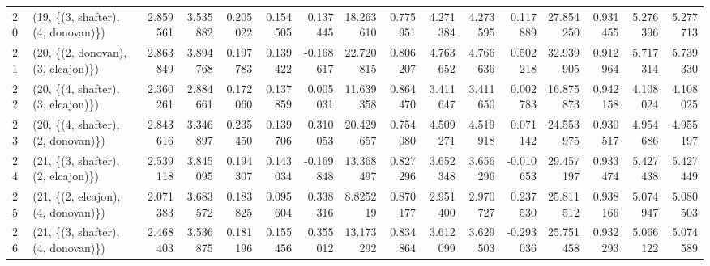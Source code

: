 \begin{tabular}{llrrrrrrrrrrrrrr}
20 &  (19, \{(3, shafter), (4, donovan)\}) &  2.859561 &  3.535882 &   0.205022 &  0.154505 &  0.137445 &  18.263610 &  0.775951 &   4.271384 &  4.273595 &  0.117889 &  27.854250 &  0.931455 &  5.276396 &  5.277713 \\
21 &  (20, \{(2, donovan), (3, elcajon)\}) &  2.863849 &  3.894768 &   0.197783 &  0.139422 & -0.168617 &  22.720815 &  0.806207 &   4.763652 &  4.766636 &  0.502218 &  32.939905 &  0.912964 &  5.717314 &  5.739330 \\
22 &  (20, \{(4, shafter), (3, elcajon)\}) &  2.360261 &  2.884661 &   0.172060 &  0.137859 &  0.005031 &  11.639358 &  0.864470 &   3.411647 &  3.411650 &  0.002783 &  16.875873 &  0.942158 &  4.108024 &  4.108025 \\
23 &  (20, \{(4, shafter), (2, donovan)\}) &  2.843616 &  3.346897 &   0.235450 &  0.139706 &  0.310053 &  20.429657 &  0.754080 &   4.509271 &  4.519918 &  0.071142 &  24.553975 &  0.930517 &  4.954686 &  4.955197 \\
24 &  (21, \{(3, shafter), (2, elcajon)\}) &  2.539118 &  3.845095 &   0.194307 &  0.143034 & -0.169848 &  13.368497 &  0.827296 &   3.652348 &  3.656296 & -0.010653 &  29.457197 &  0.933474 &  5.427438 &  5.427449 \\
25 &  (21, \{(2, elcajon), (4, donovan)\}) &  2.071383 &  3.683572 &   0.183825 &  0.095604 &  0.338316 &   8.825219 &  0.870177 &   2.951400 &  2.970727 &  0.237530 &  25.811512 &  0.938166 &  5.074947 &  5.080503 \\
26 &  (21, \{(3, shafter), (4, donovan)\}) &  2.468403 &  3.536875 &   0.181196 &  0.155456 &  0.355012 &  13.173292 &  0.834864 &   3.612099 &  3.629503 & -0.293036 &  25.751458 &  0.932293 &  5.066122 &  5.074589 \\
\bottomrule
\end{tabular}
